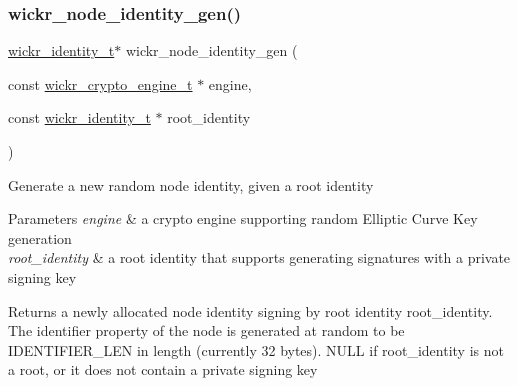 \subsubsection{\texorpdfstring{wickr\_node\_identity\_gen()}{wickr\_node\_identity\_gen()}}
{\footnotesize\ttfamily \mbox{\hyperlink{structwickr__identity}{wickr\+\_\+identity\+\_\+t}}$\ast$ wickr\+\_\+node\+\_\+identity\+\_\+gen (\begin{DoxyParamCaption}\item[{const \mbox{\hyperlink{structwickr__crypto__engine}{wickr\+\_\+crypto\+\_\+engine\+\_\+t}} $\ast$}]{engine,  }\item[{const \mbox{\hyperlink{structwickr__identity}{wickr\+\_\+identity\+\_\+t}} $\ast$}]{root\+\_\+identity }\end{DoxyParamCaption})}

Generate a new random node identity, given a root identity


\begin{DoxyParams}{Parameters}
{\em engine} & a crypto engine supporting random Elliptic Curve Key generation \\
\hline
{\em root\+\_\+identity} & a root identity that supports generating signatures with a private signing key \\
\hline
\end{DoxyParams}
\begin{DoxyReturn}{Returns}
a newly allocated node identity signing by root identity \textquotesingle{}root\+\_\+identity\textquotesingle{}. The \textquotesingle{}identifier\textquotesingle{} property of the node is generated at random to be \textquotesingle{}I\+D\+E\+N\+T\+I\+F\+I\+E\+R\+\_\+\+L\+EN\textquotesingle{} in length (currently 32 bytes). N\+U\+LL if root\+\_\+identity is not a root, or it does not contain a private signing key 
\end{DoxyReturn}
